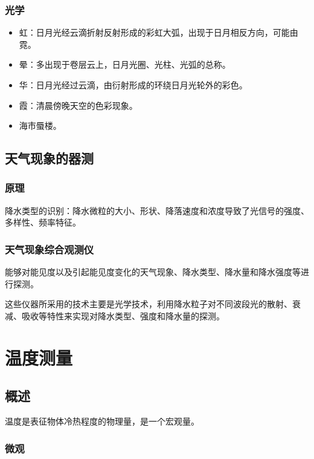 \documentclass[UTF8,11pt]{ctexbook}
\begin{document}
\subsection{光学}
\begin{itemize}
    \item 虹：日月光经云滴折射反射形成的彩虹大弧，出现于日月相反方向，可能由霓。
    \item 晕：多出现于卷层云上，日月光圈、光柱、光弧的总称。
    \item 华：日月光经过云滴，由衍射形成的环绕日月光轮外的彩色。
    \item 霞：清晨傍晚天空的色彩现象。
    \item 海市蜃楼。
\end{itemize}

\section{天气现象的器测}

\subsection{原理}

降水类型的识别：降水微粒的大小、形状、降落速度和浓度导致了光信号的强度、多样性、频率特征。

\subsection{天气现象综合观测仪}

能够对能见度以及引起能见度变化的天气现象、降水类型、降水量和降水强度等进行探测。
	

这些仪器所采用的技术主要是光学技术，利用降水粒子对不同波段光的散射、衰减、吸收等特性来实现对降水类型、强度和降水量的探测。

\chapter{温度测量}

\section{概述}

温度是表征物体冷热程度的物理量，是一个宏观量。

\subsection{微观}
\end{document}
